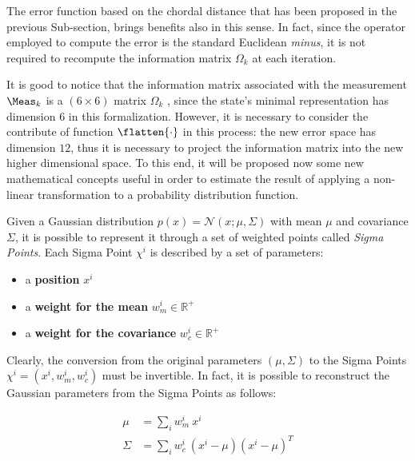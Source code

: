 The error function based on the chordal distance that has been proposed in the previous Sub-section, brings benefits also in this sense. In fact, since the operator employed to compute the error is the standard Euclidean \textit{minus}, it is not required to recompute the information matrix $\Omega_k$ at each iteration. 

It is good to notice that the information matrix associated with the measurement $\Meas_{k}$ is a $(6\times6)$ matrix $\Omega_k$ , since the state's minimal representation has dimension $6$ in this formalization. However, it is necessary to consider the contribute of function $\flatten{\cdot}$ in this process: the new error space has dimension $12$, thus it is necessary to project the information matrix into the new higher dimensional space. To this end, it will be proposed now some new mathematical concepts useful in order to estimate the result of applying a non-linear transformation to a probability distribution function. 

Given a Gaussian distribution $p(x) = \mathcal{N}(x; \mu, \Sigma)$ with mean $\mu$ and covariance $\Sigma$, it is possible to represent it through a set of weighted points called \textit{Sigma Points}. Each Sigma Point $\chi^i$ is described by a set of parameters:

\begin{itemize}
    \item a \textbf{position} $x^i$
    \item a \textbf{weight for the mean} $w_m^i \in \mathbb{R}^+$
    \item a \textbf{weight for the covariance} $w_c^i \in \mathbb{R}^+$
\end{itemize}

\noindent Clearly, the conversion from the original parameters $(\mu, \Sigma)$ to the Sigma Points $\chi^i = (x^i, w_m^i, w_c^i)$ must be invertible. In fact, it is possible to reconstruct the Gaussian parameters from the Sigma Points as follows:

\begin{align}
    \label{eq:sigma_to_mean}
    \mu &= \sum_i w_m^i \: x^i \\ 
    \label{eq:sigma_to_covariance}
    \Sigma &= \sum_i w_c^i\:(x^i - \mu)(x^i - \mu)^T
\end{align}

